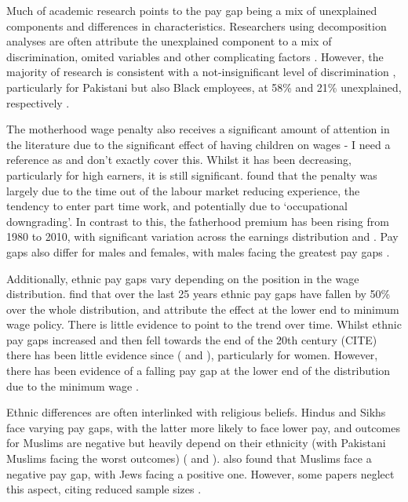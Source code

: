 \documentclass[class=article, crop=false]{standalone}
\begin{document}
Much of academic research points to the pay gap being a mix of unexplained components and differences in characteristics. Researchers using decomposition analyses are often attribute the unexplained component to a mix of discrimination, omited variables and other complicating factors \citep{Blackaby}. However, the majority of research is consistent with a not-insignificant level of discrimination \citep{Metcalf}, particularly for Pakistani but also Black employees, at 58\% and 21\% unexplained, respectively \cite[p.~100]{Blackaby}.

The motherhood wage penalty also receives a significant amount of attention in the literature due to the significant effect of having children on wages  - I need a reference as \citep{BoE} and \citep{Nizalova} don't exactly cover this. Whilst it has been decreasing, particularly for high earners, it is still significant. \cite[p.~216]{Waldfogel} found that the penalty was largely due to the time out of the labour market reducing experience, the tendency to enter part time work, and potentially due to \enquote*{occupational downgrading}. In contrast to this, the fatherhood premium has been rising from 1980 to 2010, with significant variation across the earnings distribution \citep{Glauber} and \citep{Cooke}. Pay gaps also differ for males and females, with males facing the greatest pay gaps \citep{Metcalf}.

Additionally, ethnic pay gaps vary depending on the position in the wage distribution. \citep{BoE} find that over the last 25 years ethnic pay gaps have fallen by 50\% over the whole distribution, and attribute the effect at the lower end to minimum wage policy. There is little evidence to point to the trend over time. Whilst ethnic pay gaps increased and then fell towards the end of the 20th century (CITE) there has been little evidence since (\citet{Metcalf} and \citet{Blackaby}), particularly for women. However, there has been evidence of a falling pay gap at the lower end of the distribution due to the minimum wage \citep{Gove}.

Ethnic differences are often interlinked with religious beliefs. Hindus and Sikhs face varying pay gaps, with the latter more likely to face lower pay, and outcomes for Muslims are negative but heavily depend on their ethnicity (with Pakistani Muslims facing the worst outcomes) (\citet{Johnston} and \citet{Longhi}). \citep{Metcalf} also found that Muslims face a negative pay gap, with Jews facing a positive one. However, some papers neglect this aspect, citing reduced sample sizes \citep{Brynin}.
\end{document}
